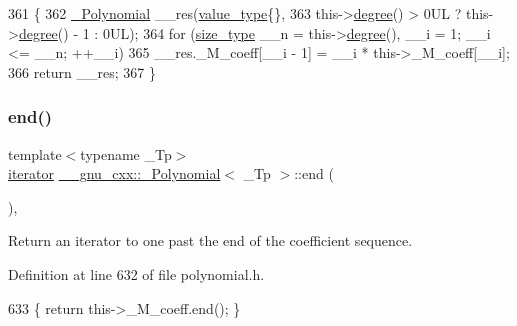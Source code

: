 \begin{DoxyCode}
361       \{
362         \hyperlink{class____gnu__cxx_1_1__Polynomial_ad2baf4c12b7e3ab131a592afa3f391ae}{\_Polynomial} \_\_res(\hyperlink{class____gnu__cxx_1_1__Polynomial_a725563351f50e76084a7a016c06f8a53}{value\_type}\{\},
363                           this->\hyperlink{class____gnu__cxx_1_1__Polynomial_a07d9933aeeb9afbd823218ed921336cb}{degree}() > 0UL ? this->\hyperlink{class____gnu__cxx_1_1__Polynomial_a07d9933aeeb9afbd823218ed921336cb}{degree}() - 1 : 0UL);
364         \textcolor{keywordflow}{for} (\hyperlink{class____gnu__cxx_1_1__Polynomial_a6afe219c123c7a2fdc5abac8a6639053}{size\_type} \_\_n = this->\hyperlink{class____gnu__cxx_1_1__Polynomial_a07d9933aeeb9afbd823218ed921336cb}{degree}(), \_\_i = 1; \_\_i <= \_\_n; ++\_\_i)
365           \_\_res.\_M\_coeff[\_\_i - 1] = \_\_i * this->\_M\_coeff[\_\_i];
366         \textcolor{keywordflow}{return} \_\_res;
367       \}
\end{DoxyCode}
\mbox{\label{class____gnu__cxx_1_1__Polynomial_a7997059cf934fc454497be9074ebc958}} 
\subsubsection{\texorpdfstring{end()}{end()}\hspace{0.1cm}{\footnotesize\ttfamily [1/2]}}
{\footnotesize\ttfamily template$<$typename \+\_\+\+Tp$>$ \\
\hyperlink{class____gnu__cxx_1_1__Polynomial_a64bd557b6af46992e352dbe9e30fa201}{iterator} \hyperlink{class____gnu__cxx_1_1__Polynomial}{\+\_\+\+\_\+gnu\+\_\+cxx\+::\+\_\+\+Polynomial}$<$ \+\_\+\+Tp $>$\+::end (\begin{DoxyParamCaption}{ }\end{DoxyParamCaption})\hspace{0.3cm}{\ttfamily [inline]}, {\ttfamily [noexcept]}}

Return an iterator to one past the end of the coefficient sequence. 

Definition at line 632 of file polynomial.\+h.


\begin{DoxyCode}
633       \{ \textcolor{keywordflow}{return} this->\_M\_coeff.end(); \}
\end{DoxyCode}
\mbox{\label{class____gnu__cxx_1_1__Polynomial_a3f971eb02150e9ca66e8222ba4a5aa3d}} 

